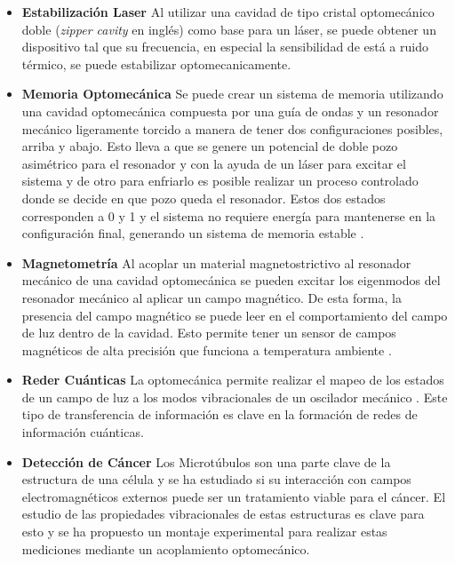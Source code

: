 \documentclass[10pt,a4paper]{report}
\begin{document}
\begin{itemize}

\item \textbf{Estabilización Laser} Al utilizar una cavidad de tipo cristal optomecánico doble (\textit{zipper cavity} en inglés) como base para un láser, se puede obtener un dispositivo tal que su frecuencia, en especial la sensibilidad de está a ruido térmico, se puede estabilizar optomecanicamente\cite{MayerZC}.

\item  \textbf{Memoria Optomecánica} Se puede crear un sistema de memoria utilizando una cavidad optomecánica compuesta por una guía de ondas y un resonador mecánico ligeramente torcido a manera de tener dos configuraciones posibles, arriba y abajo. Esto lleva a que se genere un potencial de doble pozo asimétrico para el resonador y con la ayuda de un láser para excitar el sistema y de otro para enfriarlo es posible realizar un proceso controlado donde se decide en que pozo queda el resonador. Estos dos estados corresponden a 0 y 1 y el sistema no requiere energía para mantenerse en la configuración final, generando un sistema de memoria estable \cite{BagheriMM}.

\item \textbf{Magnetometría} Al acoplar un material magnetostrictivo al resonador mecánico de una cavidad optomecánica se pueden excitar los eigenmodos del resonador mecánico al aplicar un campo magnético. De esta forma, la presencia del campo magnético se puede leer en el comportamiento del campo de luz dentro de la cavidad. Esto permite tener un sensor de campos magnéticos de alta precisión que funciona a temperatura ambiente \cite{ForstnerOM}.

\item \textbf{Reder Cuánticas} La optomecánica permite realizar el mapeo de los estados de un campo de luz a los modos vibracionales de un oscilador mecánico \cite{ZhangQST}. Este tipo de transferencia de información es clave en la formación de redes de información cuánticas.\cite{KimbleQI}

\item \textbf{Detección de Cáncer} Los Microtúbulos son una parte clave de la estructura de una célula y se ha estudiado si su interacción con campos electromagnéticos externos puede ser un tratamiento viable para el cáncer\cite{KirsonEMT}. El estudio de las propiedades vibracionales de estas estructuras es clave para esto y se ha propuesto un montaje experimental para realizar estas mediciones mediante un acoplamiento optomecánico\cite{SalariOC}.

\end{itemize} 
\end{document}
